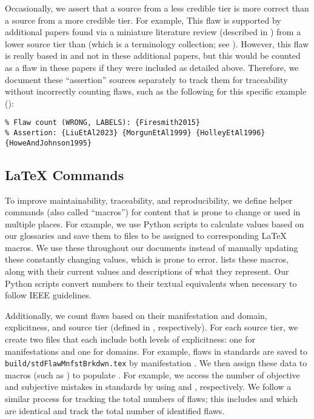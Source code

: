 \label{less-cred-assert}
Occasionally, we assert that a source from a less credible tier is more correct
than a source from a more credible tier.
For example, \tolTestFlaw*{} This flaw is supported
by additional papers found via a miniature literature review (described in
) from a lower source tier than \citep{Firesmith2015}
(which is a terminology collection; see ). However, this flaw
is really based in \citep{Firesmith2015} and not in these
additional papers, but this would be counted as a flaw in these papers if they
were included as detailed above. Therefore, we document these ``assertion''
sources separately to track them for traceability without incorrectly
counting flaws, such as the following for this specific example
():
\begin{displayquote}
    \texttt{\% Flaw count (WRONG, LABELS): \{Firesmith2015\}\\
        \% Assertion: \{LiuEtAl2023\} \{MorgunEtAl1999\} \{HolleyEtAl1996\}
        \displayNL \{HoweAndJohnson1995\}}
\end{displayquote}

\subsection[LaTeX Commands]{\LaTeX{} Commands}\label{macros}
To improve maintainability, traceability, and reproducibility, we define
helper commands (also called ``macros'') for content that is prone to change
or used in multiple places. For example, we use Python scripts to calculate
values based on our glossaries and save them to files to be assigned to
corresponding \LaTeX{} macros. We use these throughout our documents instead of
manually updating these constantly changing values, which is prone to error.
 lists these macros, along with their current values and
descriptions of what they represent. Our Python scripts convert numbers to
their textual equivalents when necessary to follow IEEE guidelines.



\label{flawCounts}
Additionally, we count flaws based on their manifestation and domain, explicitness,
and source tier (defined in , respectively).
For each source tier, we create two files that each include both levels of
explicitness: one for manifestations and one for domains. For example, flaws in
standards are saved to \texttt{build/stdFlawMnfstBrkdwn.tex} by manifestation%
. We then assign these data to macros (such as ) to
populate . For example, we access the number
of objective and subjective mistakes in standards by using
 and , respectively.
We follow a similar process for tracking the total numbers of flaws; this
includes  and 
which are identical and track the total number of identified flaws.

